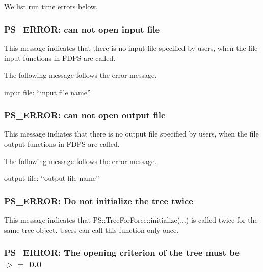 We list run time errors below.

\subsubsection{PS\_ERROR: can not open input file}

This message indicates that there is no input file specified by users,
when the file input functions in FDPS are called.

The following message follows the error message.

\begin{screen}
  input file: ``input file name''
\end{screen}


\subsubsection{PS\_ERROR: can not open output file}

This message indiates that there is no output file specified by users,
when the file output functions in FDPS are called.

The following message follows the error message.

\begin{screen}
  output file: ``output file name''
\end{screen}


\subsubsection{PS\_ERROR: Do not initialize the tree twice}

This message indicates that PS::TreeForForce::initialize(...) is
called twice for the same tree object. Users can call this function
only once.


\subsubsection{PS\_ERROR: The opening criterion of the tree must be $>=$ 0.0}

